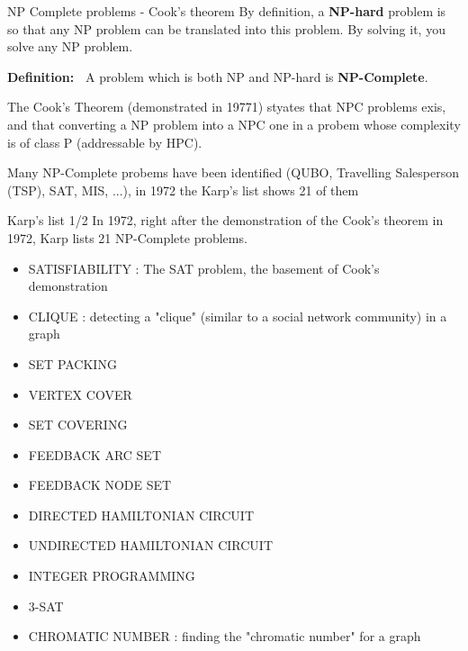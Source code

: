  \begin{frame}{NP Complete problems - Cook's theorem}
By definition, a \textbf{NP-hard} problem is so that any NP problem can be translated into this problem. By solving it,
you solve any NP problem. \newline \newline

\textbf{Definition:~} A problem which is both NP and NP-hard is \textbf{NP-Complete}. \newline \newline

The Cook's Theorem (demonstrated in 19771) styates that NPC problems exis, and that converting a NP problem into a NPC one
in a probem whose complexity is of class P (addressable by HPC). \newline \newline

Many NP-Complete probems have been identified (QUBO, Travelling Salesperson (TSP), SAT, MIS, ...), in 1972 the
Karp's list shows 21 of them
\end{frame}

\begin{frame}{Karp's list 1/2}
In 1972, right after the demonstration of the Cook's theorem in 1972, Karp lists 21 NP-Complete problems.
\begin{itemize}
    \item SATISFIABILITY : The SAT problem, the basement of Cook's demonstration
    \item CLIQUE : detecting a "clique" (similar to a social network community) in a graph
    \item SET PACKING 
    \item VERTEX COVER 
    \item SET COVERING
    \item FEEDBACK ARC SET 
    \item FEEDBACK NODE SET 
    \item DIRECTED HAMILTONIAN CIRCUIT 
    \item UNDIRECTED HAMILTONIAN CIRCUIT
    \item INTEGER PROGRAMMING 
    \item 3-SAT 
     \item CHROMATIC NUMBER : finding the "chromatic number" for a graph
\end{itemize}
\end{frame}

